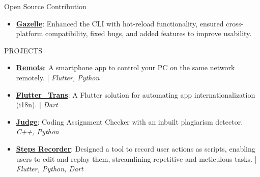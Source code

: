 \documentclass{resume} %
\begin{document}
\begin{rSection}{Open Source Contribution}
    \begin{itemize}
        \item     \textbf{\href{https://docs.gazelle-dart.dev/}{Gazelle}}: Enhanced the CLI with hot-reload functionality, ensured cross-platform compatibility, fixed bugs, and added features to improve usability.
\end{itemize}

\end{rSection}


\begin{rSection}{PROJECTS}
 \begin{itemize}
\item \textbf{\href{https://github.com/ShivanshuKGupta/remote}{Remote}}: A smartphone app to control your PC on the same network remotely. | \textit{Flutter, Python}
\item \textbf{\href{https://pub.dev/packages/fluttertrans}{Flutter\_Trans}}: A Flutter solution for automating app internationalization (i18n). | \textit{Dart}
\item \textbf{\href{https://github.com/ShivanshuKGupta/Judge}{Judge}}: Coding Assignment Checker with an inbuilt plagiarism detector. | \textit{C++, Python}
\item \textbf{\href{https://github.com/ShivanshuKGupta/Steps-Recorder}{Steps Recorder}}: Designed a tool to record user actions as scripts, enabling users to edit and replay them, streamlining repetitive and meticulous tasks. | \textit{Flutter, Python, Dart}
 \end{itemize}
\end{rSection}
\end{document}

